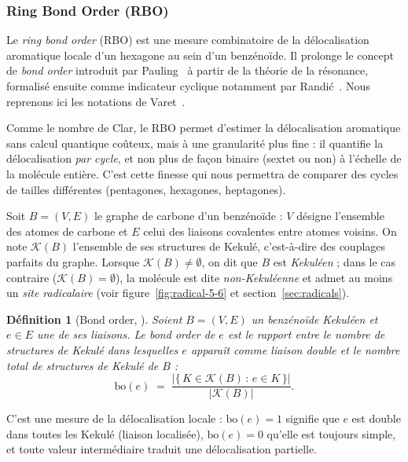 \documentclass[11pt,a4paper]{article}
\newtheorem{definition}{Définition}
\begin{document}
\subsubsection{Ring Bond Order (RBO)}
\label{sec:rbo}

Le \emph{ring bond order} (RBO) est une mesure combinatoire de la
délocalisation aromatique locale d'un hexagone au sein d'un benzénoïde.
Il prolonge le concept de \emph{bond order} introduit par
Pauling~\cite{pauling} à partir de la théorie de la résonance, formalisé
ensuite comme indicateur cyclique notamment par
Randić~\cite{randic}. Nous reprenons ici les notations de
Varet~\cite{varet2022}.

Comme le nombre de Clar, le RBO permet d'estimer la délocalisation
aromatique sans calcul quantique coûteux, mais à une granularité plus
fine : il quantifie la délocalisation \emph{par cycle}, et non plus de
façon binaire (sextet ou non) à l'échelle de la molécule entière. C'est
cette finesse qui nous permettra de comparer des cycles de tailles
différentes (pentagones, hexagones, heptagones).

Soit $B = (V, E)$ le graphe de carbone d'un benzénoïde : $V$ désigne
l'ensemble des atomes de carbone et $E$ celui des liaisons covalentes
entre atomes voisins. On note $\mathcal{K}(B)$ l'ensemble de ses
structures de Kekulé, c'est-à-dire des couplages parfaits du graphe.
Lorsque $\mathcal{K}(B) \neq \emptyset$, on dit que $B$ est
\emph{Kekuléen} ; dans le cas contraire ($\mathcal{K}(B) = \emptyset$),
la molécule est dite \emph{non-Kekuléenne} et admet au moins un
\emph{site radicalaire} (voir figure~\ref{fig:radical-5-6} et
section~\ref{sec:radicals}).

\begin{definition}[Bond order, \cite{varet2022}]
Soient $B = (V, E)$ un benzénoïde Kekuléen et $e \in E$ une de ses
liaisons. Le \emph{bond order} de $e$ est le rapport entre le nombre de
structures de Kekulé dans lesquelles $e$ apparaît comme liaison double
et le nombre total de structures de Kekulé de $B$ :
\[
  \mathrm{bo}(e) \;=\;
  \frac{\bigl|\{\, K \in \mathcal{K}(B) \,:\, e \in K \,\}\bigr|}
       {\bigl|\mathcal{K}(B)\bigr|} .
\]
\end{definition}

C'est une mesure de la délocalisation locale : $\mathrm{bo}(e) = 1$
signifie que $e$ est double dans toutes les Kekulé (liaison localisée),
$\mathrm{bo}(e) = 0$ qu'elle est toujours simple, et toute valeur
intermédiaire traduit une délocalisation partielle.
\end{document}
